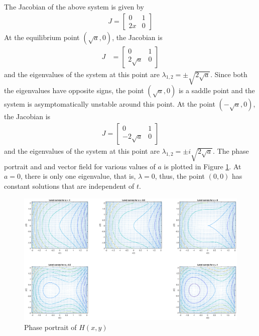 \documentclass[12pt,1in]{article}
\newenvironment{Example}[2][Example]{\begin{trivlist}
		\item[\hskip \labelsep {\bfseries #1}\hskip \labelsep {\bfseries #2.}]}{\end{trivlist}}
\begin{document}
\begin{Example}{1}
	The Jacobian of the above system is given by 
	\begin{align*}
	J = \begin{bmatrix}
	0 & 1 \\
	2x & 0
	\end{bmatrix}
	\end{align*} 
	At the equilibrium point $(\sqrt{a}, 0)$, the Jacobian is 
	\begin{align*}
	J &= \begin{bmatrix}
	0 & 1 \\
	2\sqrt{a} & 0
	\end{bmatrix}
	\end{align*}
	and the eigenvalues of the system at this point are $\lambda_{1,2} = \pm \sqrt{2 \sqrt{a}}$. Since both the eigenvalues have opposite signs, the point $(\sqrt{a}, 0)$ is a saddle point and the system is asymptomatically unstable around this point. At the point $(-\sqrt{a}, 0)$, the Jacobian is 
	\begin{align*}
	J = \begin{bmatrix}
	0 & 1 \\
	-2\sqrt{a} & 0
	\end{bmatrix}
	\end{align*} 
	and the eigenvalues of the system at this point are $\lambda_{1,2} = \pm i \sqrt{2 \sqrt{a}}$. The phase portrait and and vector field for various values of $a$ is plotted in Figure \ref{fig:hamiltonian}. At $a = 0$, there is only one eigenvalue, that is, $\lambda = 0$, thus, the point $(0,0)$ has constant solutions that are independent of $t$. 
	
\begin{figure}[H]
	\centering
	\includegraphics[trim={2in 0 1.5in 0}, width=\linewidth]{Figures/hamiltonian}
	\caption{Phase portrait of $H(x,y)$}
	\label{fig:hamiltonian}
\end{figure}
\end{Example}
\end{document}
